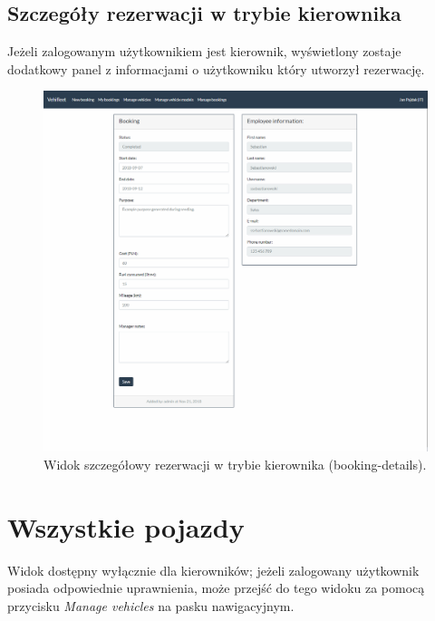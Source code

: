 \documentclass[eng,printmode,openany]{mgr}
\begin{document}
\begin{appendices}
		\subsection{Szczegóły rezerwacji w trybie kierownika}
		Jeżeli zalogowanym użytkownikiem jest kierownik, wyświetlony zostaje dodatkowy panel z informacjami o użytkowniku który utworzył rezerwację. 		
		\begin{figure}[H]
			\centering
			\includegraphics[width=\textwidth]{images/views/booking-detail-manager.png}
			\caption{Widok szczegółowy rezerwacji w trybie kierownika (booking-details).}		
		\end{figure}
		
		\newpage
		\section{Wszystkie pojazdy}
		Widok dostępny wyłącznie dla kierowników; jeżeli zalogowany użytkownik posiada odpowiednie uprawnienia, może przejść do tego widoku za pomocą przycisku \textit{Manage vehicles} na pasku nawigacyjnym.
		

\end{appendices}
\end{document}
